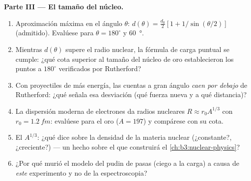 \begin{problem}
\medskip\noindent\textbf{Parte III --- El tamaño del núcleo.}
\begin{enumerate}[resume]
  \item Aproximación máxima en el ángulo $\theta$: $d(\theta) =
        \tfrac{d_0}2[1 + 1/\sin(\theta/2)]$ (admitido). Evalúese
        para $\theta = 180^\circ$ y \qty{60}{\degree}.
  \item Mientras $d(\theta)$ supere el radio nuclear, la fórmula de carga
        puntual se cumple: ¿qué cota superior al tamaño del núcleo de oro
        establecieron los puntos a $180^\circ$ verificados por
        Rutherford?
  \item Con proyectiles de más energía, las cuentas a gran ángulo
        \emph{caen por debajo} de Rutherford: ¿qué señala esa desviación
        (qué fuerza nueva y a qué distancia)?
  \item La dispersión moderna de electrones da radios nucleares $R
        \approx r_0A^{1/3}$ con $r_0 = \qty{1.2}{fm}$: evalúese
        para el oro ($A = 197$) y compárese con su cota.
  \item El $A^{1/3}$: ¿qué dice sobre la densidad de la materia nuclear
        (¿constante?, ¿creciente?) --- un hecho sobre el que construirá el
        \cref{ch:b3:nuclear-physics}?
  \item ¿Por qué murió el modelo del pudin de pasas (ciego a la carga) a
        causa de \emph{este} experimento y no de la espectroscopia?
\end{enumerate}


\end{problem}

